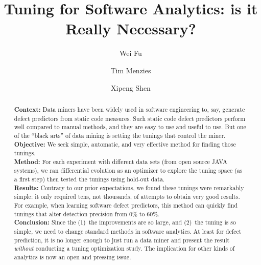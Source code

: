 \documentclass[final,twocolumn,5p]{elsarticle}
\begin{document}
\begin{frontmatter}
\title{ Tuning for Software Analytics: is it Really Necessary?}
\author{Wei Fu}
\author{Tim Menzies}
\author{Xipeng Shen}
\address{Department of Computer Science, North Carolina State University, Raleigh, NC, USA}



\begin{abstract}
\textbf{Context:} Data miners have been widely used in
software engineering to, say,  generate defect predictors from static code measures. Such static code defect predictors perform well compared to manual methods, and they are easy to use and useful to use.  But 
one of the ``black arts'' of data mining is setting the tunings that control the miner. \\
\textbf{Objective:} We seek  simple, automatic, and very effective  method for finding those tunings.\\
\textbf{Method:} For each experiment with different data sets (from open source JAVA systems), we ran differential evolution as an optimizer to explore the tuning space
(as a first step) then tested the tunings
using hold-out data.\\
\textbf{Results:} Contrary to our prior expectations, we found these tunings
 were remarkably simple: it only required tens, not thousands, of attempts
 to obtain very good results. For example, when  learning software defect predictors, this  method can quickly
 find tunings  that  alter detection  precision
 from 0\% to 60\%. \\
\textbf{Conclusion:} Since the (1)~the improvements are so large, and (2)~the tuning is so simple, we need 
to change  standard methods in software analytics.
At least for defect prediction, 
it is no longer enough to just run a data miner and present the result
{\em without}  conducting a tuning optimization study.
The implication for other kinds of  analytics is now  an open and pressing issue.

\end{abstract}
\end{frontmatter}
\end{document}
